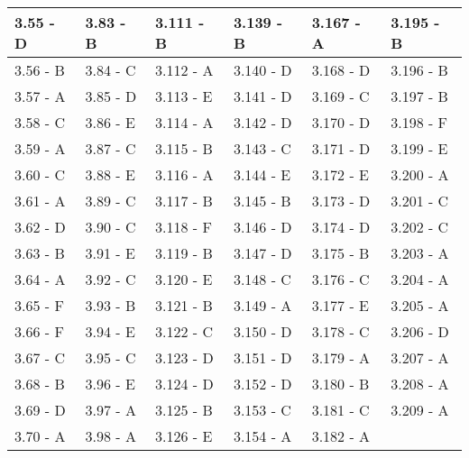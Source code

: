 \begin{center}
\begin{tabular}{|l|l|l|l|l|l|}
\hline
3.55 - D & 3.83 - B & 3.111 - B & 3.139 - B & 3.167 - A & 3.195 - B \\
\hline
3.56 - B & 3.84 - C & 3.112 - A & 3.140 - D & 3.168 - D & 3.196 - B \\
\hline
3.57 - A & 3.85 - D & 3.113 - E & 3.141 - D & 3.169 - C & 3.197 - B \\
\hline
3.58 - C & 3.86 - E & 3.114 - A & 3.142 - D & 3.170 - D & 3.198 - F \\
\hline
3.59 - A & 3.87 - C & 3.115 - B & 3.143 - C & 3.171 - D & 3.199 - E \\
\hline
3.60 - C & 3.88 - E & 3.116 - A & 3.144 - E & 3.172 - E & 3.200 - A \\
\hline
3.61 - A & 3.89 - C & 3.117 - B & 3.145 - B & 3.173 - D & 3.201 - C \\
\hline
3.62 - D & 3.90 - C & 3.118 - F & 3.146 - D & 3.174 - D & 3.202 - C \\
\hline
3.63 - B & 3.91 - E & 3.119 - B & 3.147 - D & 3.175 - B & 3.203 - A \\
\hline
3.64 - A & 3.92 - C & 3.120 - E & 3.148 - C & 3.176 - C & 3.204 - A \\
\hline
3.65 - F & 3.93 - B & 3.121 - B & 3.149 - A & 3.177 - E & 3.205 - A \\
\hline
3.66 - F & 3.94 - E & 3.122 - C & 3.150 - D & 3.178 - C & 3.206 - D \\
\hline
3.67 - C & 3.95 - C & 3.123 - D & 3.151 - D & 3.179 - A & 3.207 - A \\
\hline
3.68 - B & 3.96 - E & 3.124 - D & 3.152 - D & 3.180 - B & 3.208 - A \\
\hline
3.69 - D & 3.97 - A & 3.125 - B & 3.153 - C & 3.181 - C & 3.209 - A \\
\hline
3.70 - A & 3.98 - A & 3.126 - E & 3.154 - A & 3.182 - A &  \\
\hline
\end{tabular}
\end{center}

